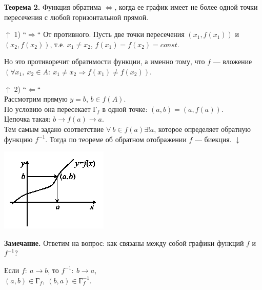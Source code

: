 \documentclass{article}
\begin{document}
    \textbf{Теорема 2.} Функция обратима $\Leftrightarrow$, когда ее график имеет не более одной точки пересечения с любой горизонтальной прямой.

    $\uparrow$ 1) ``$\Rightarrow$`` От противного. Пусть две точки пересечения $(x_1, f(x_1))$ и $(x_2, f(x_2))$, т.е. $x_1 \neq x_2$, $f(x_1) = f(x_2) = const$.
    
    Но это противоречит обратимости функции, а именно тому, что $f$ --- вложение $(\forall x_1,\ x_2 \in A:\ x_1 \neq x_2 \Rightarrow f(x_1) \neq f(x_2))$.

    \noindent\begin{minipage}{0.65\textwidth}\raggedright
        $\uparrow$ 2) ``$\Leftarrow$``\\
        Рассмотрим прямую $y = b$, $b \in f(A)$.\\
        По условию она пересекает $\textrm{Г}_f$ в одной точке: $(a, b) = (a, f(a))$.\\
        Цепочка такая: $b \rightarrow f(a) \rightarrow a$.\\
        Тем самым задано соответствие $\forall\ b \in f(a) \exists! a$, которое определяет обратную функцию $f^{-1}$. Тогда по теореме об обратном отображении $f$ --- биекция. $\downarrow$
    \end{minipage}
    \hfill%
    \begin{minipage}{0.3\textwidth}\raggedleft
        \includegraphics[scale=0.75]{4_3}
    \end{minipage}

    \textbf{Замечание.} Ответим на вопрос: как связаны между собой графики функций $f$ и $f^{-1}$?
    
    Если $f:\ a \rightarrow b$, то $f^{-1}:\ b \rightarrow a$,\\
    $(a, b) \in \textrm{Г}_f,\ (b, a) \in \textrm{Г}_f^{-1}$.
\end{document}
